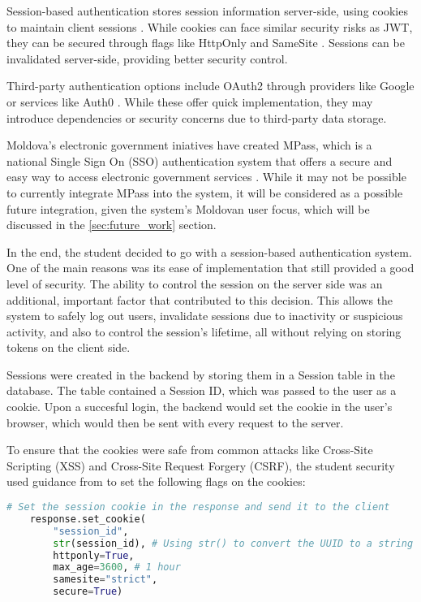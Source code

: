Session-based authentication stores session information server-side, using cookies to maintain client sessions \parencite{auth1, auth2}. While cookies can face similar security risks as JWT, they can be secured through flags like HttpOnly and SameSite \parencite{mozilla}. Sessions can be invalidated server-side, providing better security control.

Third-party authentication options include OAuth2 through providers like Google \parencite{auth2, auth3} or services like Auth0 \parencite{auth0}. While these offer quick implementation, they may introduce dependencies or security concerns due to third-party data storage. 

Moldova's electronic government iniatives have created MPass, which is a national Single Sign On (SSO) authentication system that offers a secure and easy way to access electronic government services \parencite{mpass}. While it may not be possible to currently integrate MPass into the system, it will be considered as a possible future integration, given the system's Moldovan user focus, which will be discussed in the \ref{sec:future_work} section.

In the end, the student decided to go with a session-based authentication system. One of the main reasons was its ease of implementation that still provided a good level of security. The ability to control the session on the server side was an additional, important factor that contributed to this decision. This allows the system to safely log out users, invalidate sessions due to inactivity or suspicious activity, and also to control the session's lifetime, all without relying on storing tokens on the client side.

Sessions were created in the backend by storing them in a Session table in the database. The table contained a Session ID, which was passed to the user as a cookie. Upon a succesful login, the backend would set the cookie in the user's browser, which would then be sent with every request to the server. 

To ensure that the cookies were safe from common attacks like Cross-Site Scripting (XSS) and Cross-Site Request Forgery (CSRF), the student security used guidance from \cite{owasp,mozilla} to set the following flags on the cookies:

\begin{lstlisting}[language=Python, caption=Session Cookie Flags]
    # Set the session cookie in the response and send it to the client
    response.set_cookie(
        "session_id",
        str(session_id), # Using str() to convert the UUID to a string
        httponly=True,
        max_age=3600, # 1 hour
        samesite="strict",
        secure=True)
\end{lstlisting}

